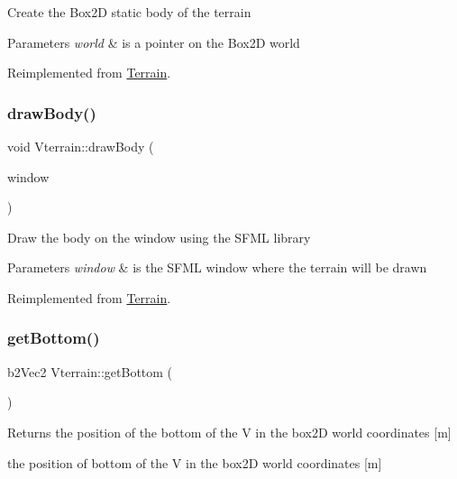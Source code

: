 Create the Box2D static body of the terrain 
\begin{DoxyParams}{Parameters}
{\em world} & is a pointer on the Box2D world \\
\hline
\end{DoxyParams}


Reimplemented from \mbox{\hyperlink{class_terrain_a97e007277f8abb9dde20ef2b49c38a3a}{Terrain}}.

\mbox{\label{class_vterrain_a4be34646206e14fe5f5aa3d39761e3fe}} 
\subsubsection{\texorpdfstring{draw\+Body()}{drawBody()}}
{\footnotesize\ttfamily void Vterrain\+::draw\+Body (\begin{DoxyParamCaption}\item[{sf\+::\+Render\+Window \&}]{window }\end{DoxyParamCaption})\hspace{0.3cm}{\ttfamily [virtual]}}

Draw the body on the window using the S\+F\+ML library 
\begin{DoxyParams}{Parameters}
{\em window} & is the S\+F\+ML window where the terrain will be drawn \\
\hline
\end{DoxyParams}


Reimplemented from \mbox{\hyperlink{class_terrain_ae60571b91c1979fa94bdfc5002da6ac7}{Terrain}}.

\mbox{\label{class_vterrain_a970e49a3753e1c4bc4424b2602c25f85}} 
\subsubsection{\texorpdfstring{get\+Bottom()}{getBottom()}}
{\footnotesize\ttfamily b2\+Vec2 Vterrain\+::get\+Bottom (\begin{DoxyParamCaption}{ }\end{DoxyParamCaption})\hspace{0.3cm}{\ttfamily [virtual]}}

\begin{DoxyReturn}{Returns}
the position of the bottom of the V in the box2D world coordinates \mbox{[}m\mbox{]}

the position of bottom of the V in the box2D world coordinates \mbox{[}m\mbox{]} 
\end{DoxyReturn}


